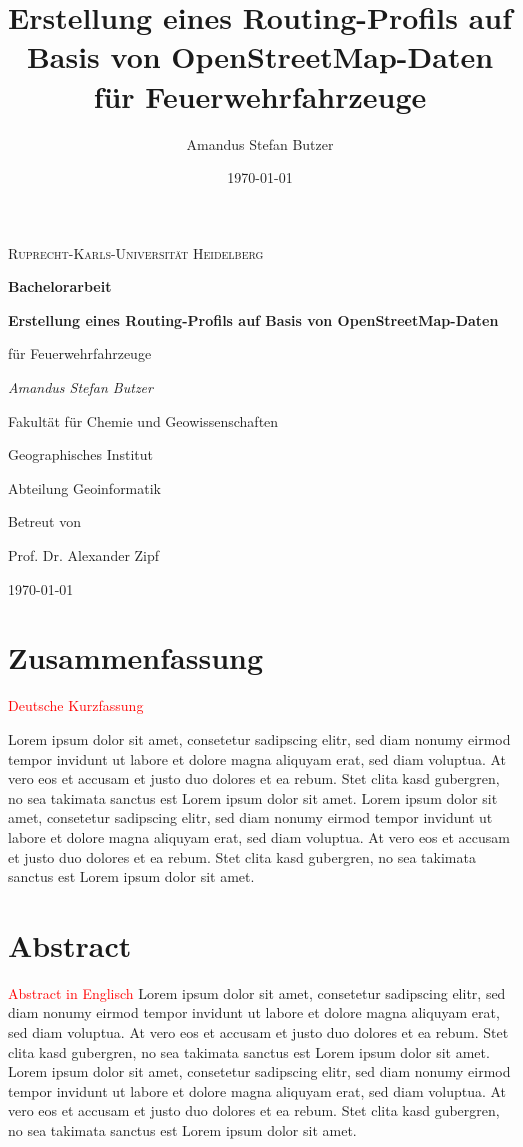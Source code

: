 \documentclass[12pt,a4paper]{article}
\author{Amandus Stefan Butzer}
\title{Erstellung eines Routing-Profils auf Basis von OpenStreetMap-Daten für Feuerwehrfahrzeuge}
\date{\today}
\newcommand\todo[1]{\textcolor{red}{#1}}
\begin{document}
\begin{titlepage}
\begin{center}

	{\scshape\LARGE Ruprecht-Karls-Universität Heidelberg\par}
	\vspace{1.5cm}
	{\LARGE\bfseries Bachelorarbeit\par}
	\vspace{2cm}
	{\Huge\bfseries Erstellung eines Routing-Profils auf Basis von OpenStreetMap-Daten\par für Feuerwehrfahrzeuge\par}
	\vspace{2cm}
	{\Large\itshape Amandus Stefan Butzer\par}
	\vspace{2cm}
	{\large Fakultät für Chemie und Geowissenschaften \par Geographisches Institut \par Abteilung Geoinformatik\par}
	\vfill
	{Betreut von\par Prof. Dr. Alexander Zipf}

	\vfill

	{\large \today\par}
\end{center}
\end{titlepage}

\newpage

{\centering\section*{Zusammenfassung}}
\todo{Deutsche Kurzfassung}\par
Lorem ipsum dolor sit amet, consetetur sadipscing elitr, sed diam nonumy eirmod tempor invidunt ut labore et dolore magna aliquyam erat, sed diam voluptua. At vero eos et accusam et justo duo dolores et ea rebum. Stet clita kasd gubergren, no sea takimata sanctus est Lorem ipsum dolor sit amet. Lorem ipsum dolor sit amet, consetetur sadipscing elitr, sed diam nonumy eirmod tempor invidunt ut labore et dolore magna aliquyam erat, sed diam voluptua. At vero eos et accusam et justo duo dolores et ea rebum. Stet clita kasd gubergren, no sea takimata sanctus est Lorem ipsum dolor sit amet.

\newpage
{\centering\section*{Abstract}}
\todo{Abstract in Englisch}
Lorem ipsum dolor sit amet, consetetur sadipscing elitr, sed diam nonumy eirmod tempor invidunt ut labore et dolore magna aliquyam erat, sed diam voluptua. At vero eos et accusam et justo duo dolores et ea rebum. Stet clita kasd gubergren, no sea takimata sanctus est Lorem ipsum dolor sit amet. Lorem ipsum dolor sit amet, consetetur sadipscing elitr, sed diam nonumy eirmod tempor invidunt ut labore et dolore magna aliquyam erat, sed diam voluptua. At vero eos et accusam et justo duo dolores et ea rebum. Stet clita kasd gubergren, no sea takimata sanctus est Lorem ipsum dolor sit amet.
\end{document}
